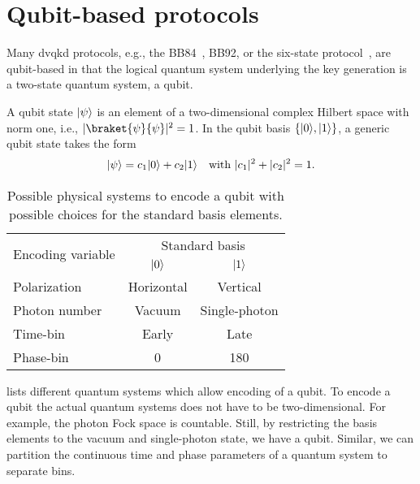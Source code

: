 \section{Qubit-based protocols}

Many \gls{dvqkd} protocols, e.g., the BB84~\cite{Bennett1984}, BB92, or the six-state protocol~\cite{Bechmann1999}, are qubit-based in that the logical quantum system underlying the key generation is a two-state quantum system, a qubit.

A qubit state $\lvert\psi\rangle$ is an element of a two-dimensional complex Hilbert space with norm one, i.e., $\abs{\braket{\psi}{\psi}}^2=1$.
In the qubit basis $\{\lvert0\rangle,\lvert1\rangle\}$, a generic qubit state takes the form
\begin{align}
	\lvert\psi\rangle
	=
	c_1\lvert0\rangle
	+
	c_2\lvert1\rangle
	&&
	\text{with}\
	\lvert c_1\rvert^2
	+
	\lvert c_2\rvert^2
	=
	1
	.
\end{align}
\begin{table}[htb]
	\centering	
	\begin{tabular}{lcc}
		\toprule
		\multirow{2}{*}{Encoding variable} & \multicolumn{2}{c}{Standard basis} \\
		\cmidrule{2-3}
		& $\lvert0\rangle$ & $\lvert1\rangle$ \\
		\midrule
		Polarization & Horizontal & Vertical \\
		Photon number & Vacuum & Single-photon \\
		Time-bin & Early & Late \\
		Phase-bin & \SI{0}{\deg} & \SI{180}{\deg} \\
		\bottomrule
	\end{tabular}
	\caption{Possible physical systems to encode a qubit with possible choices for the standard basis elements.}\label{tab:qubit_encodings}
\end{table}
 lists different quantum systems which allow encoding of a qubit.
To encode a qubit the actual quantum systems does not have to be two-dimensional.
For example, the photon Fock space is countable.
Still, by restricting the basis elements to the vacuum and single-photon state, we have a qubit.
Similar, we can partition the continuous time and phase parameters of a quantum system to separate bins.

